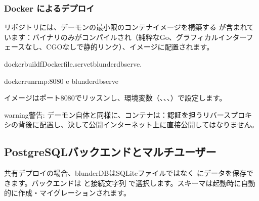 \documentclass[letterpaper,10pt,dvipdfmx]{sphinxmanual}
\begin{document}
\subsubsection{Docker によるデプロイ}
\label{\detokenize{mode_headless:deploiement-avec-docker}}\label{\detokenize{mode_headless:headless-docker}}
\sphinxAtStartPar
リポジトリには、デーモンの最小限のコンテナイメージを構築する  が含まれています：バイナリのみがコンパイルされ（純粋なGo、グラフィカルインターフェースなし、CGOなしで静的リンク）、イメージに配置されます。

\begin{sphinxVerbatim}[commandchars=\\\{\}]
dockerbuild\PYGZhy{}fDockerfile.serve\PYGZhy{}tblunderdb\PYGZhy{}serve.

dockerrun\PYGZhy{}\PYGZhy{}rm\PYGZhy{}p:8080
\PYGZhy{}e
blunderdb\PYGZhy{}serve
\end{sphinxVerbatim}

\sphinxAtStartPar
イメージはポート8080でリッスンし、環境変数（、、、）で設定します。

\begin{sphinxadmonition}{warning}{警告:}
\sphinxAtStartPar
デーモン自体と同様に、コンテナは：認証を担うリバースプロキシの背後に配置し、決して公開インターネット上に直接公開してはなりません。
\end{sphinxadmonition}


\subsection{PostgreSQLバックエンドとマルチユーザー}
\label{\detokenize{mode_headless:backend-postgresql-et-multi-utilisateurs}}\label{\detokenize{mode_headless:headless-postgres}}
\sphinxAtStartPar
共有デプロイの場合、blunderDBはSQLiteファイルではなく  にデータを保存できます。バックエンドは  と接続文字列  で選択します。スキーマは起動時に自動的に作成・マイグレーションされます。
\end{document}
